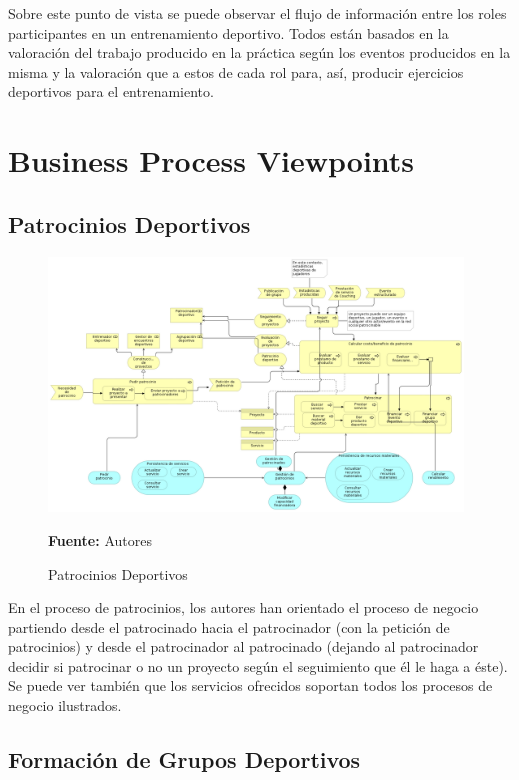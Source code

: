 Sobre este punto de vista se puede observar el flujo de información entre los roles participantes en un entrenamiento deportivo. Todos están basados en la valoración del trabajo producido en la práctica según los eventos producidos en la misma y la valoración que a estos de cada rol para, así, producir ejercicios deportivos para el entrenamiento.

\section{Business Process Viewpoints}

\subsection{Patrocinios Deportivos}

\begin{figure}[!htb]
  \begin{center}
    \includegraphics[width=11cm]{./imagenes/business_process/patrociniosdeportivos.png}
    \caption{Patrocinios Deportivos}
    \label{fig:bp_patrocinios_deportivos}
    \textbf{Fuente:}  Autores
  \end{center}
\end{figure}

En el proceso de patrocinios, los autores han orientado el proceso de negocio partiendo desde el patrocinado hacia el patrocinador (con la petición de patrocinios) y desde el patrocinador al patrocinado (dejando al patrocinador decidir si patrocinar o no un proyecto según el seguimiento que él le haga a éste). Se puede ver también que los servicios ofrecidos soportan todos los procesos de negocio ilustrados.

\subsection{Formación de Grupos Deportivos}

